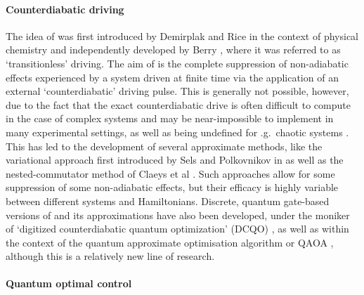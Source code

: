 \paragraph*{Counterdiabatic driving}

The idea of  was first introduced by Demirplak and Rice in the context of physical chemistry \cite{demirplak_adiabatic_2003} and independently developed by Berry \cite{berry_transitionless_2009}, where it was referred to as `transitionless' driving. The aim of  is the complete suppression of non-adiabatic effects experienced by a system driven at finite time via the application of an external `counterdiabatic' driving pulse. This is generally not possible, however, due to the fact that the exact counterdiabatic drive is often difficult to compute in the case of complex systems and may be near-impossible to implement in many experimental settings, as well as being undefined for \@e.g.~chaotic systems \cite{kolodrubetz_geometry_2017, pandey_adiabatic_2020, sugiura_adiabatic_2020}. This has led to the development of several approximate  methods, like the variational approach first introduced by Sels and Polkovnikov in \cite{sels_minimizing_2017} as well as the nested-commutator method of Claeys et al \cite{claeys_floquet-engineering_2019}. Such approaches allow for some suppression of some non-adiabatic effects, but their efficacy is highly variable between different systems and Hamiltonians. Discrete, quantum gate-based versions of  and its approximations have also been developed, under the moniker of `digitized counterdiabatic quantum optimization' (DCQO) \cite{hegade_digitized_2022}, as well as within the context of the quantum approximate optimisation algorithm or QAOA \cite{wurtz_counterdiabaticity_2022}, although this is a relatively new line of research.

\paragraph*{Quantum optimal control}

